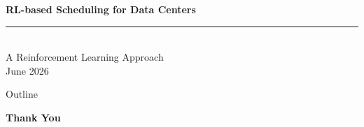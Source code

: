 



\begin{frame}[plain]
  \vfill
  \begin{center}
    {\Huge\bfseries\color{DeepBlue} RL-based Scheduling for Data Centers}\\[0.7em]
    {\color{SkyBlue}\rule{0.55\linewidth}{1.6pt}}\\[0.7em]
    {\Large\color{SkyBlue} A Reinforcement Learning Approach}\\[1.4em]
    {\large\color{DeepBlue!80!black} June 2026}
  \end{center}
  \vfill
\end{frame}

\begin{frame}{Outline}
  \tableofcontents
\end{frame}









\begin{frame}
  \centering
  \Huge\textbf{Thank You}\\[0.8em]
\end{frame}



